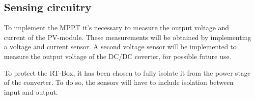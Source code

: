 
\subsection{Sensing circuitry} \label{sensors}
To implement the MPPT it's necessary to measure the output voltage and current of the PV-module. These measurements will be obtained by implementing a voltage and current sensor. A second voltage sensor will be implemented to measure the output voltage of the DC/DC coverter, for possible future use. 

To protect the RT-Box, it has been chosen to fully isolate it from the power stage of the converter. To do so, the sensors will have to include isolation between input and output.  



 
